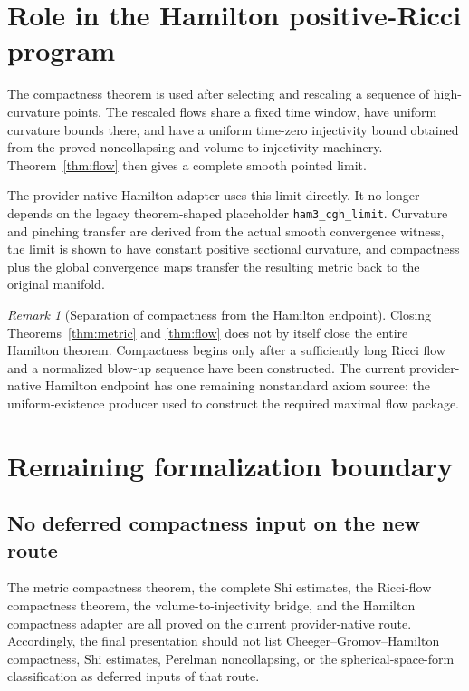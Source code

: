 \documentclass[11pt]{article}
\theoremstyle{plain}
\theoremstyle{definition}
\theoremstyle{remark}
\newtheorem{remark}[theorem]{Remark}
\newcommand{\leanref}[1]{\nolinkurl{#1}}
\begin{document}
\section{Role in the Hamilton positive-Ricci program}

The compactness theorem is used after selecting and rescaling a sequence of
high-curvature points.  The rescaled flows share a fixed time window, have
uniform curvature bounds there, and have a uniform time-zero injectivity
bound obtained from the proved noncollapsing and volume-to-injectivity
machinery.  Theorem~\ref{thm:flow} then gives a complete smooth pointed limit.

The provider-native Hamilton adapter uses this limit directly.  It no longer
depends on the legacy theorem-shaped placeholder
\leanref{ham3_cgh_limit}.  Curvature and pinching transfer are derived from
the actual smooth convergence witness, the limit is shown to have constant
positive sectional curvature, and compactness plus the global convergence
maps transfer the resulting metric back to the original manifold.

\begin{remark}[Separation of compactness from the Hamilton endpoint]
Closing Theorems~\ref{thm:metric} and \ref{thm:flow} does not by itself close
the entire Hamilton theorem.  Compactness begins only after a sufficiently
long Ricci flow and a normalized blow-up sequence have been constructed.
The current provider-native Hamilton endpoint has one remaining nonstandard
axiom source: the uniform-existence producer used to construct the required
maximal flow package.
\end{remark}

\section{Remaining formalization boundary}

\subsection{No deferred compactness input on the new route}

The metric compactness theorem, the complete Shi estimates, the Ricci-flow
compactness theorem, the volume-to-injectivity bridge, and the Hamilton
compactness adapter are all proved on the current provider-native route.
Accordingly, the final presentation should not list
Cheeger--Gromov--Hamilton compactness, Shi estimates, Perelman
noncollapsing, or the spherical-space-form classification as deferred inputs
of that route.
\end{document}
